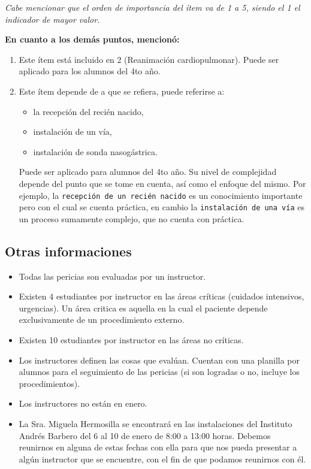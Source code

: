 \emph{Cabe mencionar que el orden de importancia del ítem va de 1 a 5,
siendo el 1 el indicador de mayor valor.}

\textbf{En cuanto a los demás puntos, mencionó:}

\begin{enumerate}
\def\labelenumi{\arabic{enumi}.}
\itemsep1pt\parskip0pt
\item
  Este ítem está incluido en 2 (Reanimación cardiopulmonar). Puede ser
  aplicado para los alumnos del 4to año.
\item
  Este ítem depende de a que se refiera, puede referirse a:

  \begin{itemize}
  \itemsep1pt\parskip0pt
  \item
    la recepción del recién nacido,
  \item
    instalación de un vía,
  \item
    instalación de sonda nasogástrica.
  \end{itemize}

  Puede ser aplicado para alumnos del 4to año. Su nivel de complejidad
  depende del punto que se tome en cuenta, así como el enfoque del
  mismo. Por ejemplo, la \texttt{recepción de un recién nacido} es un
  conocimiento importante pero con el cual se cuenta práctica, en cambio
  la \texttt{instalación de una vía} es un proceso sumamente complejo,
  que no cuenta con práctica.
\end{enumerate}

\subsection{Otras informaciones}\label{otras-informaciones}

\begin{itemize}
\itemsep1pt\parskip0pt
\item
  Todas las pericias son evaluadas por un instructor.
\item
  Existen 4 estudiantes por instructor en las áreas críticas (cuidados
  intensivos, urgencias). Un área critica es aquella en la cual el
  paciente depende exclusivamente de un procedimiento externo.
\item
  Existen 10 estudiantes por instructor en las áreas no críticas.
\item
  Los instructores definen las cosas que evalúan. Cuentan con una
  planilla por alumnos para el seguimiento de las pericias (si son
  logradas o no, incluye los procedimientos).
\item
  Los instructores no están en enero.
\item
  La Sra. Miguela Hermosilla se encontrará en las instalaciones del
  Instituto Andrés Barbero del 6 al 10 de enero de 8:00 a 13:00 horas.
  Debemos reunirnos en alguna de estas fechas con ella para que nos
  pueda presentar a algún instructor que se encuentre, con el fin de que
  podamos reunirnos con él.
\end{itemize}

